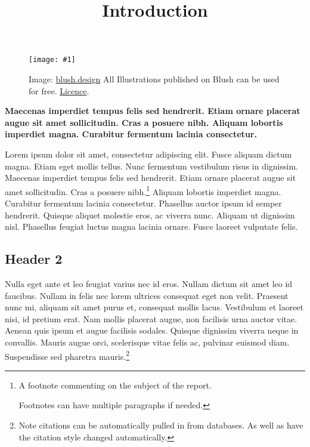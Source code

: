 \documentclass{article}
\newlength{\imgwidth}
\newcommand\scaledgraphics[2]{%
                
\settowidth{\imgwidth}{\texttt{[image: \#1]}}%
                
\setlength{\imgwidth}{\minof{\imgwidth}{#2\textwidth}}%
                
\texttt{[image: \#1]}%
                
}
\begin{document}
\title{Introduction}

\maketitle

\begin{figure}
\scaledgraphics{61c76874-4adf-40b2-9803-0a3db690688c.png}{0.75}
\caption*{Image: \href{https://blush.design/}{blush.design} All Illustrations published on Blush can be used for free. \href{https://blush.design/license}{Licence}.}\label{F94100281}
\end{figure}


\textbf{Maecenas imperdiet tempus felis sed hendrerit. Etiam ornare placerat augue sit amet sollicitudin. Cras a posuere nibh. Aliquam lobortis imperdiet magna. Curabitur fermentum lacinia consectetur.}


Lorem ipsum dolor sit amet, consectetur adipiscing elit. Fusce aliquam dictum magna. Etiam eget mollis tellus. Nunc fermentum vestibulum risus in dignissim. Maecenas imperdiet tempus felis sed hendrerit. Etiam ornare placerat augue sit amet sollicitudin. Cras a posuere nibh.\footnote{A footnote commenting on the subject of the report.


Footnotes can have multiple paragraphs if needed.} Aliquam lobortis imperdiet magna. Curabitur fermentum lacinia consectetur. Phasellus auctor ipsum id semper hendrerit. Quisque aliquet molestie eros, ac viverra nunc. Aliquam ut dignissim nisl. Phasellus feugiat luctus magna lacinia ornare. Fusce laoreet vulputate felis.


\subsection{Header 2}\label{H152469}



Nulla eget ante et leo feugiat varius nec id eros. Nullam dictum sit amet leo id faucibus. Nullam in felis nec lorem ultrices consequat eget non velit. Praesent nunc mi, aliquam sit amet purus et, consequat mollis lacus. Vestibulum et laoreet nisi, id pretium erat. Nam mollis placerat augue, non facilisis urna auctor vitae. Aenean quis ipsum et augue facilisis sodales. Quisque dignissim viverra neque in convallis. Mauris augue orci, scelerisque vitae felis ac, pulvinar euismod diam. Suspendisse sed pharetra mauris.\autocite{KayAlan197208}\footnote{Note citations can be automatically pulled in from databases. As well as have the citation style changed automatically.}
\end{document}
